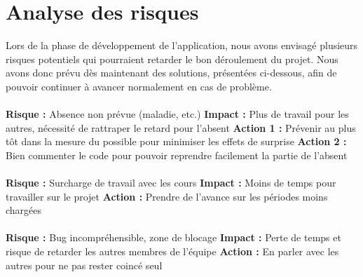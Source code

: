 \section{Analyse des risques}

Lors de la phase de développement de l’application, nous avons envisagé plusieurs risques potentiels qui pourraient retarder le bon déroulement du projet. Nous avons donc prévu dès maintenant des solutions, présentées ci-dessous, afin de pouvoir continuer à avancer normalement en cas de problème.

\paragraph{}

\textbf{Risque : } Absence non prévue (maladie, etc.)
\newline
\textbf{Impact : } Plus de travail pour les autres, nécessité de rattraper le retard pour l'absent
\newline
\textbf{Action 1 : } Prévenir au plus tôt dans la mesure du possible pour minimiser les effets de surprise
\newline
\textbf{Action 2 : } Bien commenter le code pour pouvoir reprendre facilement la partie de l’absent

\paragraph{}

\textbf{Risque : } Surcharge de travail avec les cours
\newline
\textbf{Impact : } Moins de temps pour travailler sur le projet
\newline
\textbf{Action : } Prendre de l’avance sur les périodes moins chargées

\paragraph{}

\textbf{Risque : } Bug incompréhensible, zone de blocage
\newline
\textbf{Impact : } Perte de temps et risque de retarder les autres membres de l’équipe
\newline
\textbf{Action : } En parler avec les autres pour ne pas rester coincé seul

\paragraph{}

